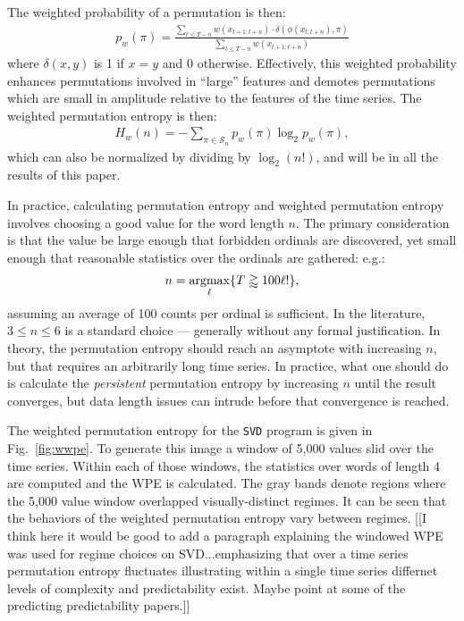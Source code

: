 \documentclass{article}
\begin{document}
The weighted probability of a permutation is then:
\begin{align*}
  p_w(\pi) = \frac{\displaystyle \sum_{t \le T - n} w(x_{t+1:t+n}) \cdot \delta(\phi(x_{t:t+n}), \pi) }{\displaystyle \sum_{t \le T - n} w(x_{t+1:t+n})}
\end{align*}
where $\delta(x, y)$ is 1 if $x = y$ and 0 otherwise. Effectively, this weighted
probability enhances permutations involved in ``large'' features and demotes
permutations which are small in amplitude relative to the features of the time
series. The weighted permutation entropy is then:
\begin{align*}
  H_w(n) = - \sum_{\pi \in \mathcal{S}_n} p_w(\pi) \log_2 p_w(\pi),
\end{align*}
which can also be normalized by dividing by $\log_2(n!)$, and will be in all the
results of this paper.

In practice, calculating permutation entropy and weighted permutation entropy
involves choosing a good value for the word length $n$. The primary
consideration is that the value be large enough that forbidden ordinals are
discovered, yet small enough that reasonable statistics over the ordinals are
gathered: e.g.:
\begin{align*}
  n = \operatornamewithlimits{argmax}_\ell \{ T \gtrapprox 100 \ell! \},
\end{align*}
assuming an average of 100 counts per ordinal is sufficient. In the literature,
$3 \le n \le 6$ is a standard choice --- generally without any formal
justification. In theory, the permutation entropy should reach an asymptote with
increasing $n$, but that requires an arbitrarily long time series. In practice,
what one should do is calculate the \emph{persistent} permutation entropy by
increasing $n$ until the result converges, but data length issues can intrude
before that convergence is reached.

The weighted permutation entropy for the {\tt SVD} program is given in
Fig.~\ref{fig:wwpe}. To generate this image a window of 5,000 values slid over
the time series. Within each of those windows, the statistics over words of
length 4 are computed and the WPE is calculated. The gray bands denote regions
where the 5,000 value window overlapped visually-distinct regimes. It can be
seen that the behaviors of the weighted permutation entropy vary between
regimes. [[I think here it would be good to add a paragraph explaining the windowed WPE was used for regime choices on SVD...emphasizing  that over a time series permutation entropy fluctuates illustrating within a single time series differnet levels of complexity and predictability exist. Maybe point at some of the predicting predictability papers.]]
\end{document}
